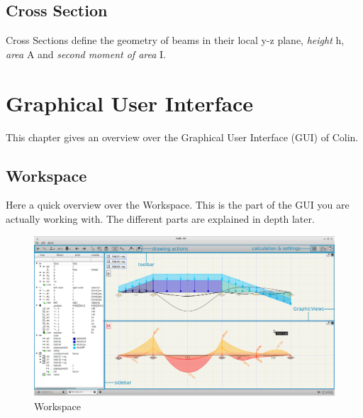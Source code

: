 \documentclass[a4paper,11pt]{report}
\begin{document}
\section{Cross Section}
Cross Sections define the geometry of beams in their local y-z plane,  \textit{height} h, \textit{area} A and \textit{second moment of area} I.

\chapter{Graphical User Interface}

This chapter gives an overview over the Graphical User Interface (GUI) of Colin.

\section{Workspace}
\label{sec:workspace}

Here a quick overview over the Workspace. This is the part of the GUI you are actually working with. The different parts are explained in depth later.
\begin{figure}[H]
\includegraphics[width=\textwidth]{../pictures/workspace_overlay.png}
\caption{Workspace}
\label{pic:workspace}
\end{figure}
\end{document}
